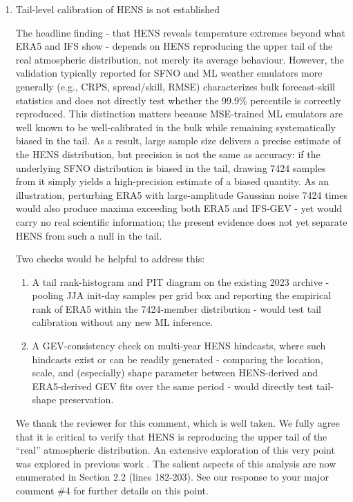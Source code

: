 \documentclass[11pt]{article}
\newcommand{\newTxt}{\textcolor{cadmiumgreen}}
\begin{document}
\begin{enumerate}
\item Tail-level calibration of HENS is not established

The headline finding - that HENS reveals temperature extremes beyond what ERA5 and IFS show - depends on HENS reproducing the upper tail of the real atmospheric distribution, not merely its average behaviour. However, the validation typically reported for SFNO and ML weather emulators more generally (e.g., CRPS, spread/skill, RMSE) characterizes bulk forecast-skill statistics and does not directly test whether the 99.9\% percentile is correctly reproduced. This distinction matters because MSE-trained ML emulators are well known to be well-calibrated in the bulk while remaining systematically biased in the tail. As a result, large sample size delivers a precise estimate of the HENS distribution, but precision is not the same as accuracy: if the underlying SFNO distribution is biased in the tail, drawing 7424 samples from it simply yields a high-precision estimate of a biased quantity. As an illustration, perturbing ERA5 with large-amplitude Gaussian noise 7424 times would also produce maxima exceeding both ERA5 and IFS-GEV - yet would carry no real scientific information; the present evidence does not yet separate HENS from such a null in the tail.

Two checks would be helpful to address this:
\begin{enumerate}
    \item A tail rank-histogram and PIT diagram on the existing 2023 archive - pooling JJA init-day samples per grid box and reporting the empirical rank of ERA5 within the 7424-member distribution - would test tail calibration without any new ML inference.

    \item A GEV-consistency check on multi-year HENS hindcasts, where such hindcasts exist or can be readily generated - comparing the location, scale, and (especially) shape parameter between HENS-derived and ERA5-derived GEV fits over the same period - would directly test tail-shape preservation.
\end{enumerate}


\newTxt{We thank the reviewer for this comment, which is well taken. We fully agree that it is critical to verify that HENS is reproducing the upper tail of the ``real'' atmospheric distribution. An extensive exploration of this very point was explored in previous work \citep{Mahesh2024hugeensemblesidesign, Mahesh2024hugeensemblespartii}. The salient aspects of this analysis are now enumerated in Section 2.2 (lines 182-203). See our response to your major comment \#4 for further details on this point.}


\end{enumerate}
\end{document}
